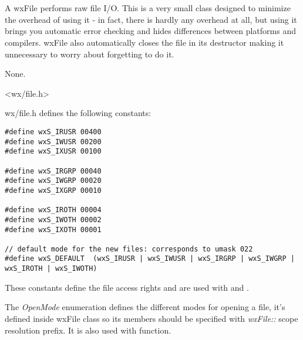 \section{}\label{wxfile}

A wxFile performs raw file I/O. This is a very small class designed to
minimize the overhead of using it - in fact, there is hardly any overhead at
all, but using it brings you automatic error checking and hides differences
between platforms and compilers. wxFile also automatically closes the file in
its destructor making it unnecessary to worry about forgetting to do it.


None.


<wx/file.h>


wx/file.h defines the following constants:

\begin{verbatim}
#define wxS_IRUSR 00400
#define wxS_IWUSR 00200
#define wxS_IXUSR 00100

#define wxS_IRGRP 00040
#define wxS_IWGRP 00020
#define wxS_IXGRP 00010

#define wxS_IROTH 00004
#define wxS_IWOTH 00002
#define wxS_IXOTH 00001

// default mode for the new files: corresponds to umask 022
#define wxS_DEFAULT  (wxS_IRUSR | wxS_IWUSR | wxS_IRGRP | wxS_IWGRP | wxS_IROTH | wxS_IWOTH)
\end{verbatim}

These constants define the file access rights and are used with 
 and .

The {\it OpenMode} enumeration defines the different modes for opening a file,
it's defined inside wxFile class so its members should be specified with {\it wxFile::} scope
resolution prefix. It is also used with  function.

\twocolwidtha{7cm}
\begin{twocollist}\itemsep=0pt%
\end{twocollist}

